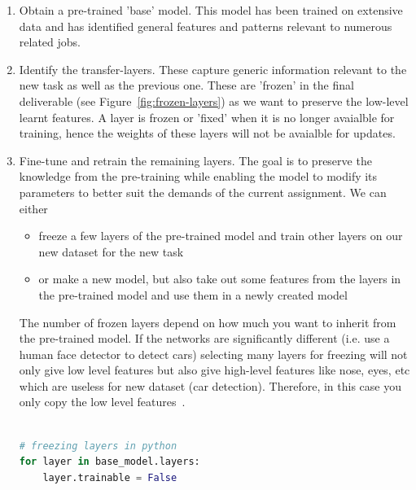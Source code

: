 \documentclass[11pt]{article}
\begin{document}
\begin{enumerate}
    \item Obtain a pre-trained 'base' model. This model has been trained on extensive data and has identified general features and patterns relevant to numerous related jobs.
    \item Identify the transfer-layers. These capture generic information relevant to the new task as well as the previous one. These are 'frozen' in the final deliverable (see Figure~\ref{fig:frozen-layers}) as we want to preserve the low-level learnt features. A layer is frozen or 'fixed' when it is no longer avaialble for training, hence the weights of these layers will not be avaialble for updates.
    \item Fine-tune and retrain the remaining layers. The goal is to preserve the knowledge from the pre-training while enabling the model to modify its parameters to better suit the demands of the current assignment. We can either
          \begin{itemize}
              \item freeze a few layers of the pre-trained model and train other layers on our new dataset for the new task
              \item or make a new model, but also take out some features from the layers in the pre-trained model and use them in a newly created model
          \end{itemize}
          The number of frozen layers depend on how much you want to inherit from the pre-trained model. If the networks are significantly different (i.e. use a human face detector to detect cars) selecting many layers for freezing will not only give low level features but also give high-level features like nose, eyes, etc which are useless for new dataset (car detection). Therefore, in this case you only copy the low level features~\cite{geeks-transfer-learning}.

          \begin{lstlisting}[language=python] 
        
# freezing layers in python
for layer in base_model.layers: 
    layer.trainable = False

    \end{lstlisting}
\end{enumerate}
\end{document}
